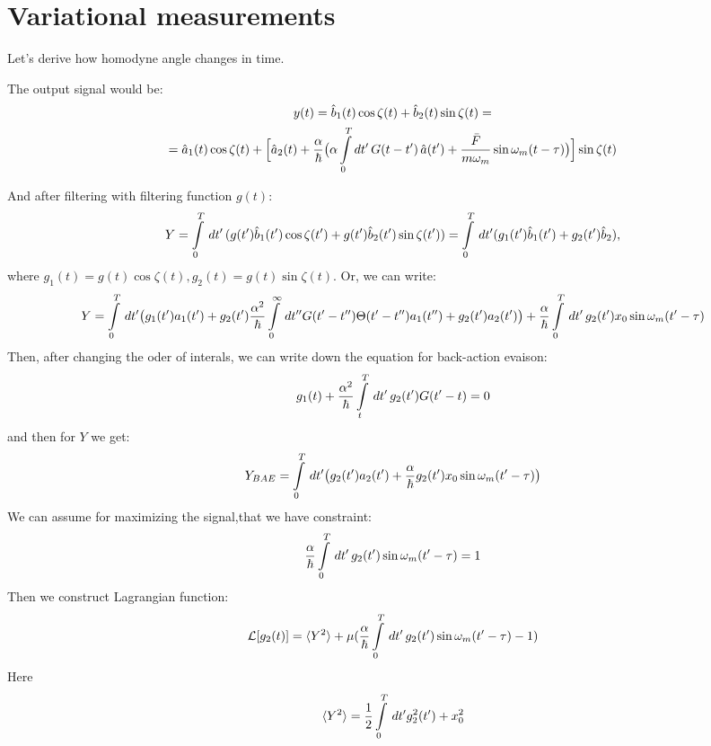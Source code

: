 \section{Variational measurements}\label{appx:variational}

Let's derive how homodyne angle changes in time.

The output signal would be:
\begin{multline}
 y(t)=\hat{b}_1(t)\cos\zeta(t)+\hat{b}_2(t)\sin\zeta(t) = \\
=\hat{a}_1(t)\cos \zeta(t)+\Bigl[\hat{a}_2(t)+\frac{\alpha}{\hbar}\bigl(\alpha \int\limits_0^{T} dt' \, G(t-t') \, \hat{a}(t') + \frac{\bar{F}}{m\omega_m}\sin\omega_m(t-\tau)\bigr)\Bigr]\sin\zeta(t)
\end{multline}

And after filtering with filtering function $g(t)$:
\begin{equation}
 Y=\int\limits_{0}^{T}\,dt'\,(g(t')\hat{b}_1(t')\cos\zeta(t')+g(t')\hat{b}_2(t')\sin\zeta(t')) = \int\limits_{0}^{T}\,dt'(g_1(t')\hat{b}_1(t')+g_2(t')\hat{b}_2),
\end{equation}
where $g_1(t)=g(t)\cos\zeta(t), g_2(t)=g(t)\sin\zeta(t)$.
Or, we can write:
\begin{equation}
 Y = \int\limits_{0}^{T}\, dt' \bigl(g_1(t')a_1(t')+g_2(t')\frac{\alpha^2}{\hbar}\int\limits_{0}^{\infty}\,dt''G(t'-t'')\Theta(t'-t'')a_1(t'') + g_2(t')a_2(t')\bigr) + \frac{\alpha}{\hbar}\int\limits_{0}^{T}\,dt'\,g_2(t')x_0\sin\omega_m(t'-\tau)
\end{equation}
Then, after changing the oder of interals, we can write down the equation for back-action evaison:
\begin{equation}\label{BAE}
 g_1(t)+\frac{\alpha^2}{\hbar}\int\limits_{t}^{T}\,dt'\,g_2(t')G(t'-t)=0
\end{equation}
and then for $Y$ we get:
\begin{equation}
 Y_{BAE} = \int\limits_{0}^{T}\, dt' \bigl(g_2(t')a_2(t') + \frac{\alpha}{\hbar}g_2(t')x_0\sin\omega_m(t'-\tau)\bigr)
\end{equation}
We can assume for maximizing the signal,that we have constraint:
\begin{equation}
 \frac{\alpha}{\hbar}\int\limits_{0}^{T}\,dt'\,g_2(t')\sin\omega_m(t'-\tau) = 1
\end{equation}
Then we construct Lagrangian function:
\begin{equation}\label{L}
 \mathcal{L}[g_2(t)] = \langle Y^2\rangle + \mu (\frac{\alpha}{\hbar}\int\limits_{0}^{T}\,dt'\,g_2(t')\sin\omega_m(t'-\tau) - 1)
\end{equation}
Here 
\begin{equation}\label{<Y>}
 \langle Y^2\rangle = \frac{1}{2}\int\limits_{0}^{T}\,dt'g_2^2(t') + x_0^2
\end{equation}
